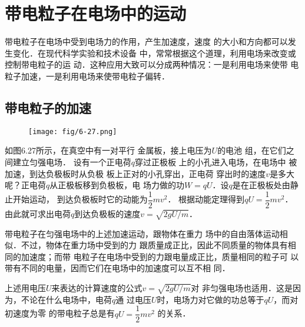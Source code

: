 \begin{figure}[htp]\centering
    \caption{}
\end{figure}	

\section{带电粒子在电场中的运动}

带电粒子在电场中受到电场力的作用，产生加速度，速度
的大小和方向都可以发生变化．在现代科学实验和技术设备
中，常常根据这个道理，利用电场来改变或控制带电粒子的运
动．这种应用大致可以分成两种情况：一是利用电场来使带
电粒子加速，一是利用电场来使带电粒子偏转．

\subsection{带电粒子的加速}
\begin{figure}[htp]\centering
	\texttt{[image: fig/6-27.png]}
	\caption{}
	\end{figure}

如图6.27所示，在真空中有一对平行
金属板，接上电压为$U$的电池
组，在它们之间建立匀强电场．
设有一个正电荷$q$穿过正极板
上的小孔进入电场，在电场中
被加速，到达负极板时从负极
板上正对的小孔穿出，正电荷
穿出时的速度$v$是多大呢？正电荷$q$从正极板移到负极板，电
场力做的功$W=qU$．设$q$是在正极板处由静止开始运动，
到达负极板时它的动能为$\dfrac{1}{2}mv^2$．
根据动能定理得到$qU=\dfrac{1}{2}mv^2$．
由此就可求出电荷$q$到达负极板的速度$v=\sqrt{2gU/m}$．

带电粒子在匀强电场中的上述加速运动，跟物体在重力
场中的自由落体运动相似．不过，物体在重力场中受到的力
跟质量成正比，因此不同质量的物体具有相同的加速度；而带
电粒子在电场中受到的力跟电量成正比，质量相同的粒子可
以带有不同的电量，因而它们在电场中的加速度可以互不相
同．

上述用电压$U$来表达的计算速度的公式$v=\sqrt{2gU/m}$对
非匀强电场也适用．这是因为，不论在什么电场中，电荷$q$通
过电压$U$时，电场力对它做的功总等于$qU$，而对初速度为零
的带电粒子总是有$qU=\dfrac{1}{2}mv^2$
的关系．

